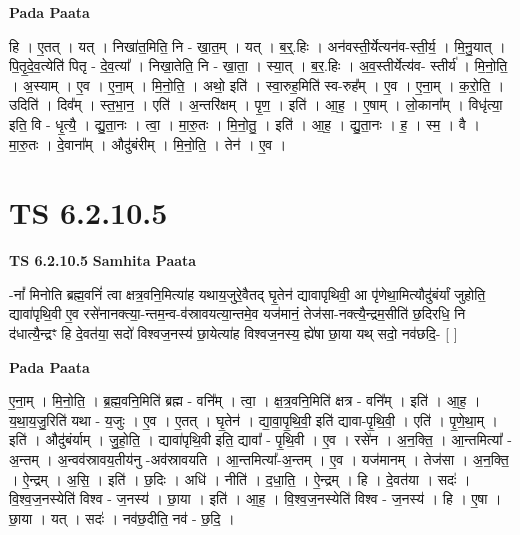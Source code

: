 \documentclass[17pt]{extarticle}
\begin{document}
\textbf{Pada Paata} \newline

हि । ए॒तत् । यत् । निखा॑त॒मिति॒ नि - खा॒त॒म् । यत् । ब॒र्॒.हिः । अन॑वस्ती॒र्येत्यन॑व-स्ती॒र्य॒ । मि॒नु॒यात् । पि॒तृ॒दे॒व॒त्येति॑ पितृ - दे॒व॒त्या᳚ । निखा॒तेति॒ नि - खा॒ता॒ । स्या॒त् । ब॒र॒.हिः । अ॒व॒स्तीर्येत्य॑व- स्तीर्य॑ । मि॒नो॒ति॒ । अ॒स्याम् । ए॒व । ए॒ना॒म् । मि॒नो॒ति॒ । अथो॒ इति॑ । स्वा॒रुह॒मिति॑ स्व-रुह᳚म् । ए॒व । ए॒ना॒म् । क॒रो॒ति॒ । उदिति॑ । दिव᳚म् । स्त॒भा॒न॒ । एति॑ । अ॒न्तरि॑क्षम् । पृ॒ण॒ । इति॑ । आ॒ह॒ । ए॒षाम् । लो॒काना᳚म् । विधृ॑त्या॒ इति॒ वि - धृ॒त्यै॒ । द्यु॒ता॒नः । त्वा॒ । मा॒रु॒तः । मि॒नो॒तु॒ । इति॑ । आ॒ह॒ । द्यु॒ता॒नः । ह॒ । स्म॒ । वै । मा॒रु॒तः । दे॒वाना᳚म् । औदु॑बंरीम् । मि॒नो॒ति॒ । तेन॑ । ए॒व ।  \newline





\section{ TS 6.2.10.5 }

\textbf{TS 6.2.10.5 } \newline
\textbf{Samhita Paata} \newline

-नां᳚ मिनोति ब्रह्म॒वनिं॑ त्वा क्षत्र॒वनि॒मित्या॑ह यथाय॒जुरे॒वैतद् घृ॒तेन॑ द्यावापृथिवी॒ आ पृ॑णेथा॒मित्यौदु॑बंर्यां जुहोति॒ द्यावा॑पृथि॒वी ए॒व रसे॑नानक्त्या॒-न्तम॒न्व-व॑स्रावयत्या॒न्तमे॒व यज॑मानं॒ तेज॑सा-नक्त्यै॒न्द्रम॒सीति॑ छ॒दिरधि॒ नि द॑धात्यै॒न्द्रꣳ हि दे॒वत॑या॒ सदो॑ विश्वज॒नस्य॑ छा॒येत्या॑ह विश्वज॒नस्य॒ ह्ये॑षा छा॒या यथ् सदो॒ नव॑छदि॒- [  ] \newline

\textbf{Pada Paata} \newline

ए॒ना॒म् । मि॒नो॒ति॒ । ब्र॒ह्म॒वनि॒मिति॑ ब्रह्म - वनि᳚म् । त्वा॒ । क्ष॒त्र॒वनि॒मिति॑ क्षत्र - वनि᳚म् । इति॑ । आ॒ह॒ । य॒था॒य॒जु॒रिति॑ यथा - य॒जुः । ए॒व । ए॒तत् । घृ॒तेन॑ । द्या॒वा॒पृ॒थि॒वी॒ इति॑ द्यावा-पृ॒थि॒वी॒ । एति॑ । पृ॒णे॒था॒म् । इति॑ । औदु॑बंर्याम् । जु॒हो॒ति॒ । द्यावा॑पृथि॒वी इति॒ द्यावा᳚ - पृ॒थि॒वी । ए॒व । रसे॑न । अ॒न॒क्ति॒ । आ॒न्तमित्या᳚ - अ॒न्तम् । अ॒न्वव॑स्रावय॒तीय॑नु -अव॑स्रावयति । आ॒न्तमित्या᳚-अ॒न्तम् । ए॒व । यज॑मानम् । तेज॑सा । अ॒न॒क्ति॒ । ऐ॒न्द्रम् । अ॒सि॒ । इति॑ । छ॒दिः । अधि॑ । नीति॑ । द॒धा॒ति॒ । ऐ॒न्द्रम् । हि । दे॒वत॑या । सदः॑ । वि॒श्व॒ज॒नस्येति॑ विश्व - ज॒नस्य॑ । छा॒या । इति॑ । आ॒ह॒ । वि॒श्व॒ज॒नस्येति॑ विश्व - ज॒नस्य॑ । हि । ए॒षा । छा॒या । यत् । सदः॑ । नव॑छ॒दीति॒ नव॑ - छ॒दि॒ ।  \newline
\end{document}
